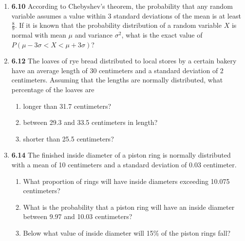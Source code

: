 \documentclass[basic, header]{nosvagor-notes}
\begin{document}
\begin{enumerate}[itemsep=4em]

  \item \textbf{6.10} According to Chebyshev’s theorem, the probability that any
    random variable assumes a value within 3 standard deviations of the mean is
    at least \(\frac{8}{9}\). If it is known that the probability distribution of a random
    variable \(X\) is normal with mean \(\mu\) and variance \(\sigma^2\), what is the exact value
    of \(P(\mu − 3\sigma < X < \mu + 3\sigma)\)?

  \item \textbf{6.12} The loaves of rye bread distributed to local stores by a certain
    bakery have an average length of 30 centimeters and a standard deviation of
    2 centimeters. Assuming that the lengths are normally distributed, what
    percentage of the loaves are
    \begin{enumerate}

      \item longer than 31.7 centimeters?

      \item between 29.3 and 33.5 centimeters in length?

      \item shorter than 25.5 centimeters?

    \end{enumerate}

  \item \textbf{6.14} The finished inside diameter of a piston ring is normally
    distributed with a mean of 10 centimeters and a standard deviation of 0.03
    centimeter.
    \begin{enumerate}

      \item What proportion of rings will have inside diameters exceeding
        10.075 centimeters?

      \item What is the probability that a piston ring will have an inside
        diameter between 9.97 and 10.03 centimeters?

      \item Below what value of inside diameter will 15\% of the piston rings
        fall?

    \end{enumerate}

  \newpage %


\end{enumerate}
\end{document}
